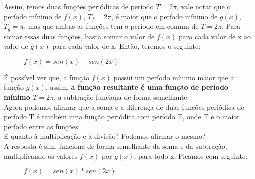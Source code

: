 Assim, temos duas funções periódicas de período $T = 2\pi$, vale notar que o período mínimo 
de $f(x)$, $T_f = 2\pi$, é maior que o período mínimo de $g(x)$, $T_g = \pi$, mas
que ambas as funções tem o período em comum de $T = 2\pi$. Para somar essas duas
funções, basta somar o valor de $f(x)$ para cada valor de x ao valor de $g(x)$ para 
cada valor de x. Então, teremos o seguinte:
\begin{figure}[H]
    \caption{$f(x)=sen(x)+sen(2x)$}
    \label{fig:addExp}
\end{figure}

É possível ver que, a função $f(x)$ possui um período mínimo maior que a função $g(x)$,
assim, \textbf{a função resultante é uma função de período mínimo $T = 2\pi$}, a 
subtração funciona de forma semelhante.\\

Agora podemos afirmar que a soma e a diferença de duas funções 
periódica de período T é também uma função periódica com período T, onde
T é o maior período entre as funções.\\

E quanto à multiplicação e à divisão? Podemos afirmar o mesmo?\\

A resposta é sim, funciona de forma semelhante da soma e da subtração, multiplicando
os valores $f(x)$ por $g(x)$, para todo x. Ficamos com seguinte:
\begin{figure}[H]
    \caption{$f(x)=sen(x)*sen(2x)$}
    \label{fig:multExp}
\end{figure}

